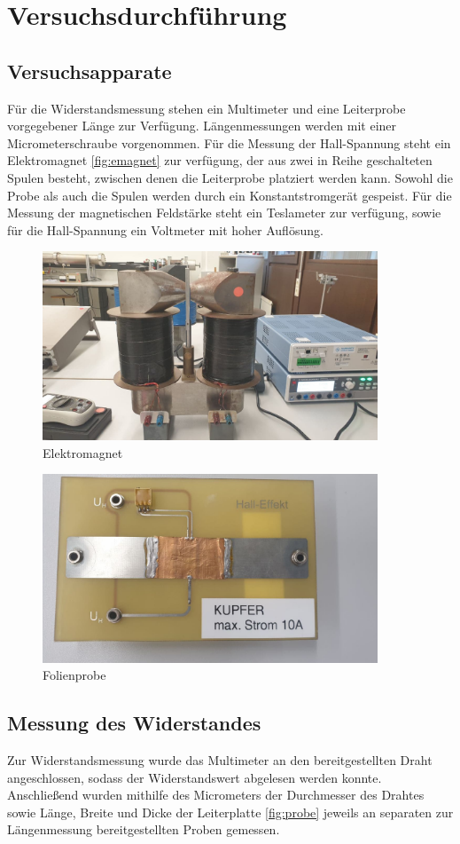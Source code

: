 \section{Versuchsdurchführung}
\subsection{Versuchsapparate}
Für die Widerstandsmessung stehen ein Multimeter und eine Leiterprobe vorgegebener Länge zur Verfügung. 
Längenmessungen werden mit einer Micrometerschraube vorgenommen. Für die Messung der Hall-Spannung steht 
ein Elektromagnet \autoref{fig:emagnet} zur verfügung, der aus zwei in Reihe geschalteten Spulen besteht, zwischen denen die 
Leiterprobe platziert werden kann. Sowohl die Probe als auch die Spulen werden durch ein Konstantstromgerät 
gespeist. Für die Messung der magnetischen Feldstärke steht ein Teslameter zur verfügung, sowie für die 
Hall-Spannung ein Voltmeter mit hoher Auflösung.
\begin{figure}
    \centering
    \includegraphics[width=10cm]{magnet.png}
    \caption{Elektromagnet}
    \label{fig:emagnet}
  \end{figure}

  \begin{figure}
    \centering
    \includegraphics[width=10cm]{probe.png}
    \caption{Folienprobe}
    \label{fig:probe}
  \end{figure}
\subsection{Messung des Widerstandes}
Zur Widerstandsmessung wurde das Multimeter an den bereitgestellten Draht angeschlossen, sodass der 
Widerstandswert abgelesen werden konnte. Anschließend wurden mithilfe des Micrometers der Durchmesser 
des Drahtes sowie Länge, Breite und Dicke der Leiterplatte \autoref{fig:probe} jeweils an separaten zur Längenmessung 
bereitgestellten Proben gemessen.
